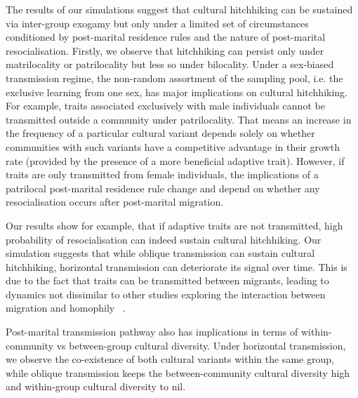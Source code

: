 \documentclass[9pt,twocolumn,twoside,lineno]{pnas-new}
\begin{document}
The results of our simulations suggest that cultural hitchhiking can be sustained via inter-group exogamy but only under a limited set of circumstances conditioned by post-marital residence rules and the nature of post-marital resocialisation. 
Firstly, we observe that hitchhiking can persist only under matrilocality or patrilocality but less so under bilocality.
Under a sex-biased transmission regime, the non-random assortment of the sampling pool, i.e. the exclusive learning from one sex, has major implications on cultural hitchhiking. 
For example, traits associated exclusively with male individuals cannot be transmitted outside a community under patrilocality.
That means an increase in the frequency of a particular cultural variant depends solely on whether communities with such variants have a competitive advantage in their growth rate (provided by the presence of a more beneficial adaptive trait).
However, if traits are only transmitted from female individuals, the implications of a patrilocal post-marital residence rule change and depend on whether any resocialisation occurs after post-marital migration.

Our results show for example, that if adaptive traits are not transmitted, high probability of resocialisation can indeed sustain cultural hitchhiking. Our simulation suggests that while oblique transmission can sustain cultural hitchhiking, horizontal transmission can deteriorate its signal over time. This is due to the fact that traits can be transmitted between migrants, leading to dynamics not dissimilar to other studies exploring the interaction between migration and homophily ~\citep{mesoudi_migration_2018}. 

Post-marital transmission pathway also has implications in terms of within-community vs between-group cultural diversity. Under horizontal transmission, we observe the co-existence of both cultural variants within the same group, while oblique transmission keeps the between-community cultural diversity high and within-group cultural diversity to nil. 
\end{document}
